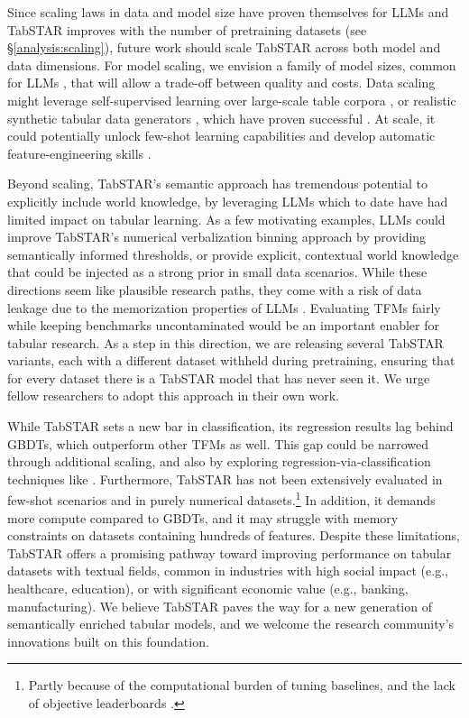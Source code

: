 \documentclass{article}
\begin{document}
Since scaling laws in data and model size have proven themselves for LLMs \cite{kaplan_scaling_2020} and TabSTAR improves with the number of pretraining datasets (see \S\ref{analysis:scaling}), future work should scale TabSTAR across both model and data dimensions. For model scaling, we envision a family of model sizes, common for LLMs \cite{grattafiori_llama_2024, team_gemini_2025, lenz_jamba_2024}, that will allow a trade-off between quality and costs. Data scaling might leverage self-supervised learning \cite{rubachev_revisiting_2022} over large-scale table corpora \cite{eggert_tablib_2023}, or realistic synthetic tabular data generators \cite{borisov_language_2022}, which have proven successful \cite{hollmann_accurate_2025, ansari_chronos_2024}. At scale, it could potentially unlock few-shot learning capabilities and develop automatic feature-engineering skills \cite{hollmann_large_2023}.

Beyond scaling, TabSTAR's semantic approach has tremendous potential to explicitly include world knowledge, by leveraging LLMs which to date have had limited impact on tabular learning. As a few motivating examples, LLMs could improve TabSTAR's numerical verbalization binning approach by providing semantically informed thresholds, or provide explicit, contextual world knowledge that could be injected as a strong prior in small data scenarios. While these directions seem like plausible research paths, they come with a risk of data leakage due to the memorization properties of LLMs \cite{bordt_elephants_2024}. Evaluating TFMs fairly while keeping benchmarks uncontaminated would be an important enabler for tabular research. As a step in this direction, we are releasing several TabSTAR variants, each with a different dataset withheld during pretraining, ensuring that for every dataset there is a TabSTAR model that has never seen it. We urge fellow researchers to adopt this approach in their own work.

While TabSTAR sets a new bar in classification, its regression results lag behind GBDTs, which outperform other TFMs as well. This gap could be narrowed through additional scaling, and also by exploring regression-via-classification techniques like \cite{hollmann_accurate_2025, ansari_chronos_2024}. Furthermore, TabSTAR has not been extensively evaluated in few-shot scenarios and in purely numerical datasets.\footnote{Partly because of the computational burden of tuning baselines, and the lack of objective leaderboards \cite{tschalzev_unreflected_2025}.} In addition, it demands more compute compared to GBDTs, and it may struggle with memory constraints on datasets containing hundreds of features. Despite these limitations, TabSTAR offers a promising pathway toward improving performance on tabular datasets with textual fields, common in industries with high social impact (e.g., healthcare, education), or with significant economic value (e.g., banking, manufacturing). We believe TabSTAR paves the way for a new generation of semantically enriched tabular models, and we welcome the research community's innovations built on this foundation.
\end{document}
